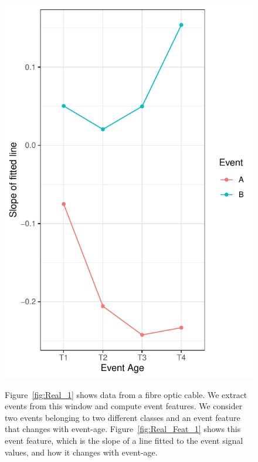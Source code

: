 \documentclass[a4paper,11pt]{article}
\begin{document}
\begin{figure}
{		\includegraphics[scale=0.8]{./Graphics/Two_Event_Features.pdf} 
		\label{fig:Real_Feat_1} %
	}
	
	\caption{Figure~\ref{fig:Real_1} shows data from a fibre optic cable. We extract events  from this window and compute event features. We consider two events belonging to two different classes and an event feature that changes with event-age.  Figure~\ref{fig:Real_Feat_1} shows this event feature, which is the slope of a line fitted to the event signal values, and how it changes with event-age.}
	\label{fig:Real_World_Data}
\end{figure}
\end{document}
